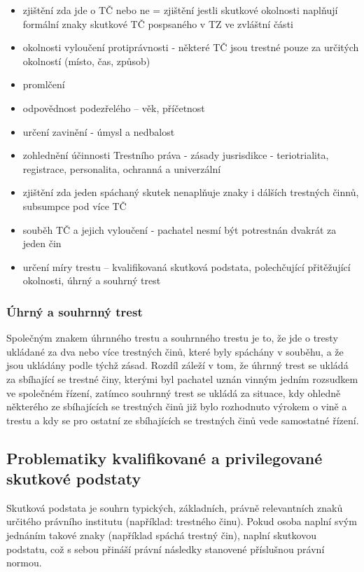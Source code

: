 \begin{itemize}
    \item zjištění zda jde o TČ nebo ne = zjištění jestli skutkové okolnosti naplňují formální znaky skutkové TČ pospsaného v TZ ve zvláštní části
    \item okolnosti vyloučení protiprávnosti - některé TČ jsou trestné pouze za určitých okolností (místo, čas, způsob) \item promlčení
    \item odpovědnost podezřelého -- věk, příčetnost
    \item určení zavinění - úmysl a nedbalost
    \item zohlednění účinnosti Trestního práva - zásady jusrisdikce - teriotrialita, registrace, personalita, ochranná a univerzální
    \item zjištění zda jeden spáchaný skutek nenaplňuje znaky i dálších trestných činnů, subsumpce pod více TČ
    \item souběh TČ a jejich vyloučení - pachatel nesmí být potrestnán dvakrát za jeden čin
    \item určení míry trestu -- kvalifikovaná skutková podstata, polechčující přitěžující okolnosti, úhrný
    a souhrný trest
\end{itemize}

\subsubsection{Úhrný a souhrnný trest}
Společným znakem úhrnného trestu a souhrnného trestu je to, že jde o tresty ukládané za dva nebo více trestných činů, které byly spáchány v souběhu, a že jsou ukládány podle týchž zásad. Rozdíl záleží v tom, že úhrnný trest se ukládá za sbíhající se trestné činy, kterými byl pachatel uznán vinným jedním rozsudkem ve společném řízení, zatímco souhrnný trest se ukládá za situace, kdy ohledně některého ze sbíhajících se trestných činů již bylo rozhodnuto výrokem o vině a trestu a kdy se pro ostatní ze sbíhajících se trestných činů vede samostatné řízení.

\subsection{Problematiky kvalifikované a privilegované skutkové podstaty}
Skutková podstata je souhrn typických, základních, právně relevantních znaků určitého právního institutu (například: trestného činu). Pokud osoba naplní svým jednáním takové znaky (například spáchá trestný čin), naplní skutkovou podstatu, což s sebou přináší právní následky stanovené příslušnou právní normou.

